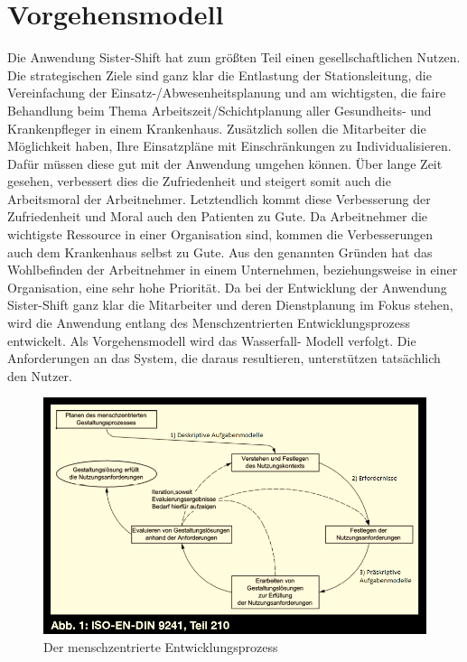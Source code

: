 \documentclass[10pt,a4paper]{article}
\begin{document}
\section{Vorgehensmodell}
Die Anwendung Sister-Shift hat zum größten Teil einen gesellschaftlichen Nutzen. Die strategischen Ziele sind ganz klar die Entlastung der Stationsleitung, die Vereinfachung der Einsatz-/Abwesenheitsplanung und am wichtigsten, die faire Behandlung beim Thema Arbeitszeit/Schichtplanung aller Gesundheits- und Krankenpfleger in einem Krankenhaus. Zusätzlich sollen die Mitarbeiter die Möglichkeit haben, Ihre Einsatzpläne mit Einschränkungen zu Individualisieren. Dafür müssen diese gut mit der Anwendung umgehen können. Über lange Zeit gesehen, verbessert dies die Zufriedenheit und steigert somit auch die Arbeitsmoral der Arbeitnehmer. Letztendlich kommt diese Verbesserung der Zufriedenheit und Moral auch den Patienten zu Gute. Da Arbeitnehmer die wichtigste Ressource in einer Organisation sind, kommen die Verbesserungen auch dem Krankenhaus selbst zu Gute. Aus den genannten Gründen hat das Wohlbefinden der Arbeitnehmer in einem Unternehmen, beziehungsweise in einer Organisation, eine sehr hohe Priorität. 
Da bei der Entwicklung der Anwendung Sister-Shift ganz klar die Mitarbeiter und deren Dienstplanung im Fokus stehen, wird die Anwendung entlang des Menschzentrierten Entwicklungsprozess entwickelt. Als Vorgehensmodell wird das Wasserfall- Modell verfolgt. Die Anforderungen an das System, die daraus resultieren, unterstützen tatsächlich den Nutzer. 
\begin{figure}[h]
\includegraphics[scale=0.55]{Bilder/Vorgehensmodell.png}{\centering}
\caption{Der menschzentrierte Entwicklungsprozess}{\centering}
\end{figure}
\end{document}
